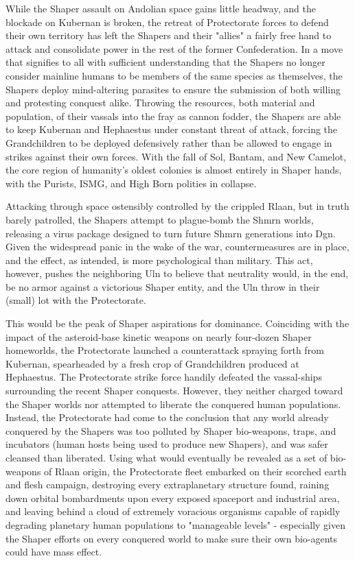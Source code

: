 While the Shaper assault on Andolian space gains little headway, and
the blockade on Kubernan is broken, the retreat of Protectorate forces
to defend their own territory has left the Shapers and their "allies"
a fairly free hand to attack and consolidate power in the rest of the
former Confederation. In a move that signifies to all with sufficient
understanding that the Shapers no longer consider mainline humans to
be members of the same species as themselves, the Shapers deploy
mind-altering parasites to ensure the submission of both willing and
protesting conquest alike. Throwing the resources, both material and
population, of their vassals into the fray as cannon fodder, the
Shapers are able to keep Kubernan and Hephaestus under constant threat
of attack, forcing the Grandchildren to be deployed defensively rather
than be allowed to engage in strikes against their own forces. With
the fall of Sol, Bantam, and New Camelot, the core region of
humanity's oldest colonies is almost entirely in Shaper hands, with
the Purists, ISMG, and High Born polities in collapse.

Attacking through space ostensibly controlled by the crippled Rlaan,
but in truth barely patrolled, the Shapers attempt to plague-bomb the
Shmrn worlds, releasing a virus package designed to turn future Shmrn
generations into Dgn. Given the widespread panic in the wake of the
war, countermeasures are in place, and the effect, as intended, is
more psychological than military. This act, however, pushes the
neighboring Uln to believe that neutrality would, in the end, be no
armor against a victorious Shaper entity, and the Uln throw in their
(small) lot with the Protectorate.

This would be the peak of Shaper aspirations for dominance. Coinciding
with the impact of the asteroid-base kinetic weapons on nearly
four-dozen Shaper homeworlds, the Protectorate launched a
counterattack spraying forth from Kubernan, spearheaded by a fresh
crop of Grandchildren produced at Hephaestus. The Protectorate strike
force handily defeated the vassal-ships surrounding the recent Shaper
conquests. However, they neither charged toward the Shaper worlds nor
attempted to liberate the conquered human populations. Instead, the
Protectorate had come to the conclusion that any world already
conquered by the Shapers was too polluted by Shaper bio-weapons,
traps, and incubators (human hosts being used to produce new Shapers),
and was safer cleansed than liberated. Using what would eventually be
revealed as a set of bio-weapons of Rlaan origin, the Protectorate
fleet embarked on their scorched earth and flesh campaign, destroying
every extraplanetary structure found, raining down orbital
bombardments upon every exposed spaceport and industrial area, and
leaving behind a cloud of extremely voracious organisms capable of
rapidly degrading planetary human populations to "manageable levels" -
especially given the Shaper efforts on every conquered world to make
sure their own bio-agents could have mass effect.

